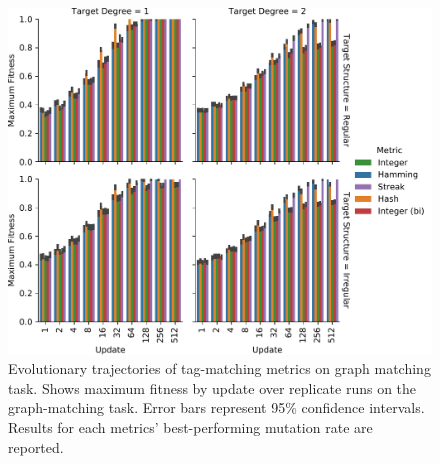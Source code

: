 \begin{figure}

\includegraphics[width=\linewidth]{img/target_evolve/viz=max-fitness-bar+_data_hathash_hash=673d309ab90e91d1+_script_fullcat_hash=6c7848b1ac357236+ext=}

\caption{
Evolutionary trajectories of tag-matching metrics on graph matching task.
Shows maximum fitness by update over replicate runs on the graph-matching task.
Error bars represent 95\% confidence intervals.
Results for each metrics' best-performing mutation rate are reported.
}
\label{fig:evolve_bests}
\end{figure}